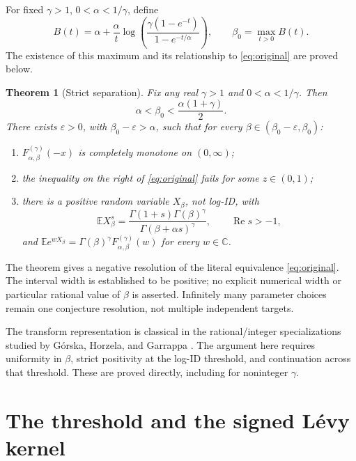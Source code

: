 \documentclass[11pt,a4paper]{article}
\numberwithin{equation}{section}
\newtheorem{theorem}{Theorem}[section]
\theoremstyle{definition}\newtheorem{definition}[theorem]{Definition}
\theoremstyle{remark}\newtheorem{remark}[theorem]{Remark}
\newcommand{\C}{\mathbb C}
\newcommand{\E}{\mathbb E}
\DeclareMathOperator{\Rea}{Re}
\begin{document}
For fixed \(\gamma>1\), \(0<\alpha<1/\gamma\), define
\begin{equation}\label{eq:B}
 B(t)=\alpha+\frac{\alpha}{t}
 \log\!\left(\frac{\gamma(1-e^{-t})}{1-e^{-t/\alpha}}\right),
 \qquad
 \beta_0=\max_{t>0}B(t).
\end{equation}
The existence of this maximum and its relationship to
\eqref{eq:original} are proved below.

\begin{theorem}[Strict separation]\label{thm:main}
Fix any real \(\gamma>1\) and \(0<\alpha<1/\gamma\). Then
\[
 \alpha<\beta_0<\frac{\alpha(1+\gamma)}2.
\]
There exists \(\varepsilon>0\), with \(\beta_0-\varepsilon>\alpha\),
such that for every \(\beta\in(\beta_0-\varepsilon,\beta_0)\):
\begin{enumerate}
\item \(F_{\alpha,\beta}^{(\gamma)}(-x)\) is completely monotone on
\((0,\infty)\);
\item the inequality on the right of \eqref{eq:original} fails for some
\(z\in(0,1)\);
\item there is a positive random variable \(X_\beta\), not log-ID, with
\begin{equation}\label{eq:moment}
 \E X_\beta^s
 =\frac{\Gamma(1+s)\Gamma(\beta)^\gamma}
 {\Gamma(\beta+\alpha s)^\gamma},\qquad \Rea s>-1,
\end{equation}
and \(\E e^{wX_\beta}=\Gamma(\beta)^\gamma
F_{\alpha,\beta}^{(\gamma)}(w)\) for every \(w\in\C\).
\end{enumerate}
\end{theorem}

The theorem gives a negative resolution of the literal equivalence
\eqref{eq:original}. The interval width is established to be positive;
no explicit numerical width or particular rational value of \(\beta\)
is asserted. Infinitely many parameter choices remain one conjecture
resolution, not multiple independent targets.

The transform representation is classical in the rational/integer
specializations studied by G\'orska, Horzela, and Garrappa \cite{GHG}.
The argument here requires uniformity in \(\beta\), strict positivity at
the log-ID threshold, and continuation across that threshold. These are
proved directly, including for noninteger \(\gamma\).

\section{The threshold and the signed L\'evy kernel}
\end{document}
